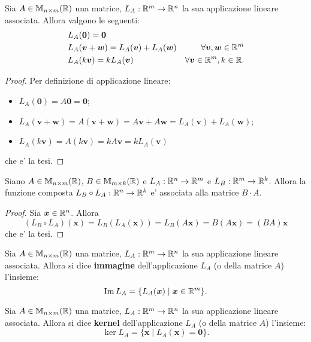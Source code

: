 \begin{proposition}
    Sia $A \in \mathbb{M}_{n \times m}(\mathbb{R})$ una matrice, $L_A : \mathbb{R}^m \to \mathbb{R}^n$ la sua applicazione lineare associata. Allora valgono le seguenti:
    \begin{align}
        &L_A(\bm 0) = \bm 0 \\
        &L_A(\bm v + \bm w) = L_A(\bm v) + L_A(\bm w) &\forall \bm v, \bm w \in \mathbb{R}^m \\
        &L_A(k\bm v) = kL_A(\bm v) &\forall \bm v \in \mathbb{R}^m, k \in \mathbb{R}. 
    \end{align}
\end{proposition}
\begin{proof}
    Per definizione di applicazione lineare:
    \begin{itemize}
        \item $L_A(\bm 0) = A\bm 0 = \bm 0$;
        \item $L_A(\bm v + \bm w) = A(\bm v + \bm w) = A\bm v + A\bm w = L_A(\bm v) + L_A(\bm w)$;
        \item $L_A(k\bm v) = A(k\bm v) = kA\bm v = kL_A(\bm v)$
    \end{itemize}
    che e' la tesi.
\end{proof}

\begin{proposition}
    Siano $A \in \mathbb{M}_{n \times m}(\mathbb{R})$, $B \in \mathbb{M}_{m \times k}(\mathbb{R})$ e $L_A : \mathbb{R}^n \to \mathbb{R}^m$ e $L_B : \mathbb{R}^m \to \mathbb{R}^k$. Allora la funzione composta $L_B \circ L_A : \mathbb{R}^n \to \mathbb{R}^k$ e' associata alla matrice $B\cdot A$.
\end{proposition}
\begin{proof}
    Sia $\bm{x} \in \mathbb{R}^n$. Allora
    \[
        (L_B \circ L_A)(\bm{x}) = L_B(L_A(\bm{x})) = L_B(A\bm{x}) = B(A\bm{x}) = (BA)\bm{x}
    \]
    che e' la tesi.
\end{proof}

\begin{definition}
    Sia $A \in \mathbb{M}_{n \times m}(\mathbb{R})$ una matrice, $L_A : \mathbb{R}^m \to \mathbb{R}^n$ la sua applicazione lineare associata. Allora si dice \textbf{immagine} dell'applicazione $L_A$ (o della matrice $A$) l'insieme:
    \begin{equation}
        \operatorname{Im}L_A = \{L_A(\bm x) \mid \bm x \in \mathbb{R}^m\}.
    \end{equation}
\end{definition}

\begin{definition}
    Sia $A \in \mathbb{M}_{n \times m}(\mathbb{R})$ una matrice, $L_A : \mathbb{R}^m \to \mathbb{R}^n$ la sua applicazione lineare associata. Allora si dice \textbf{kernel} dell'applicazione $L_A$ (o della matrice $A$) l'insieme:
    \begin{equation}
        \ker{L_A} = \{\bm x \mid L_A(\bm x) = \bm 0\}.
    \end{equation}
\end{definition}

